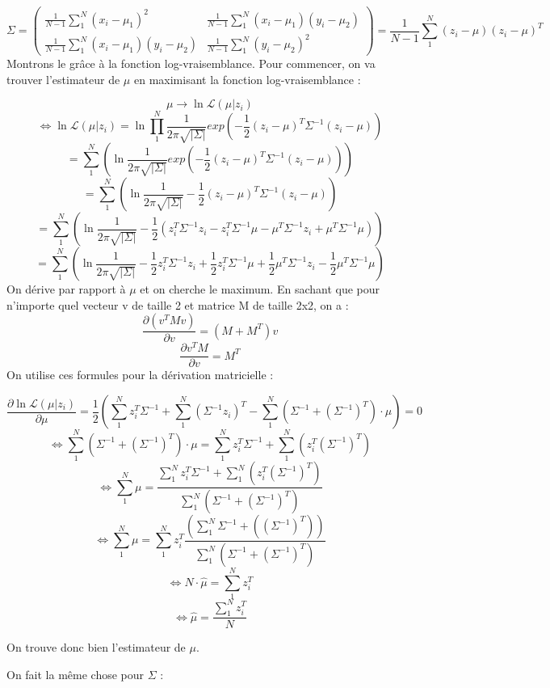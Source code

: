 \documentclass{article}
\begin{document}
\[
\Sigma = \begin{pmatrix}\frac{1}{N-1}\sum_{1}^{N}(x_i-\mu_1)^{2} & \frac{1}{N-1}\sum_{1}^{N}(x_i-\mu_1)(y_i-\mu_2) \\\frac{1}{N-1}\sum_{1}^{N}(x_i-\mu_1)(y_i-\mu_2) & \frac{1}{N-1}\sum_{1}^{N}(y_i-\mu_2)^{2}\end{pmatrix} = \frac{1}{N-1}\sum_{1}^{N}(z_i-\mu)(z_i-\mu)^{T}
\]
Montrons le grâce à la fonction log-vraisemblance. Pour commencer,
on va trouver l'estimateur de $\mu$ en maximisant la fonction log-vraisemblance :

$$\mu \rightarrow \ln \mathcal{L}(\mu | z_i)$$
$$\Leftrightarrow \ln \mathcal{L}(\mu | z_i)=\ln \prod_{1}^{N} \frac{1}{2\pi\sqrt{|\Sigma|}}exp(-\frac{1}{2}(z_i-\mu)^{T}\Sigma^{-1}(z_i-\mu))$$
$$= \sum_{1}^{N} (\ln \frac{1}{2\pi\sqrt{|\Sigma|}}exp(-\frac{1}{2}(z_i-\mu)^{T}\Sigma^{-1}(z_i-\mu)))$$
$$= \sum_{1}^{N} (\ln \frac{1}{2\pi\sqrt{|\Sigma|}} -\frac{1}{2}(z_i-\mu)^{T}\Sigma^{-1}(z_i-\mu))$$
$$= \sum_{1}^{N} (\ln \frac{1}{2\pi\sqrt{|\Sigma|}} -\frac{1}{2}(z_i^{T}\Sigma^{-1}z_i - z_i^{T}\Sigma^{-1}\mu - \mu^{T}\Sigma^{-1}z_i + \mu^{T}\Sigma^{-1}\mu))$$
$$= \sum_{1}^{N} (\ln \frac{1}{2\pi\sqrt{|\Sigma|}} -\frac{1}{2}z_i^{T}\Sigma^{-1}z_i + \frac{1}{2}z_i^{T}\Sigma^{-1}\mu + \frac{1}{2}\mu^{T}\Sigma^{-1}z_i - \frac{1}{2}\mu^{T}\Sigma^{-1}\mu)$$
On dérive par rapport à $\mu$ et on cherche le maximum. En sachant que pour n'importe quel vecteur v de taille 2 et matrice M de taille 2x2, on a :
$$\frac{\partial (v^{T}Mv)}{\partial v} = (M+M^{T})v$$
$$\frac{\partial v^{T}M}{\partial v} = M^{T}$$
On utilise ces formules pour la dérivation matricielle :

$$\frac{\partial \ln \mathcal{L}(\mu | z_i)}{\partial \mu} = \frac{1}{2}(\sum_{1}^{N}z_i^{T}\Sigma^{-1}+\sum_{1}^{N}(\Sigma^{-1}z_i)^{T}-\sum_{1}^{N}(\Sigma^{-1}+(\Sigma^{-1})^{T})\cdot\mu) = 0$$
$$\Leftrightarrow \sum_{1}^{N}(\Sigma^{-1}+(\Sigma^{-1})^{T})\cdot\mu = \sum_{1}^{N}z_i^{T}\Sigma^{-1}+\sum_{1}^{N}(z_i^{T}(\Sigma^{-1})^{T})$$
$$\Leftrightarrow \sum_{1}^{N}\mu = \frac{\sum_{1}^{N}z_i^{T}\Sigma^{-1}+\sum_{1}^{N}(z_i^{T}(\Sigma^{-1})^{T})}{\sum_{1}^{N}(\Sigma^{-1}+(\Sigma^{-1})^{T})}$$
$$\Leftrightarrow \sum_{1}^{N}\mu = \sum_{1}^{N}z_i^{T}\frac{(\sum_{1}^{N}\Sigma^{-1}+((\Sigma^{-1})^{T}))}{\sum_{1}^{N}(\Sigma^{-1}+(\Sigma^{-1})^{T})}$$
$$\Leftrightarrow N\cdot\hat{\mu} = \sum_{1}^{N}z_i^{T}$$
$$\Leftrightarrow \hat{\mu} = \frac{\sum_{1}^{N}z_i^{T}}{N}$$

On trouve donc bien l'estimateur de $\mu$.

On fait la même chose pour $\Sigma$ :
\end{document}
